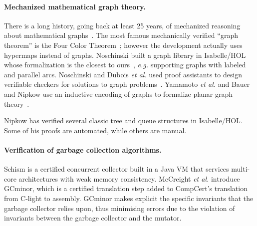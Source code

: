 \vspace{-1ex}
\paragraph{Mechanized mathematical graph theory.} There is a long history,
going back at least 25 years, of mechanized reasoning about mathematical
graphs~\cite{wong1991}.  The most famous mechanically verified ``graph theorem''
is the Four Color Theorem~\cite{gonthier2005computer}; however
the development actually uses hypermaps instead of graphs.
Noschinski built a graph library in Isabelle/HOL whose formalization
is the closest to ours~\cite{noschinski2015}, \emph{e.g.} supporting
graphs with labeled and parallel arcs.
Noschinski and Dubois \emph{et al.} used proof assistants to design verifiable
checkers for solutions to graph problems~\cite{noschinski2015formalizing,dubois2015graphes}.
Yamamoto \emph{et al.} and Bauer and Nipkow use an inductive
encoding of graphs to formalize planar graph theory~\cite{yamamoto1995formalization,bauer20025}.

Nipkow \cite{nipkow2016, nipkow2017} has verified several classic
tree and queue structures in Isabelle/HOL. Some of his proofs are automated, while
others are manual. 

\paragraph{Verification of garbage collection algorithms.}
Schism \cite{gcexample4,gcexample4a} is a certified concurrent
collector built in a Java VM that services multi-core architectures with weak memory consistency.
McCreight \emph{et al.} \cite{gcexample5, gcexample3} introduce GCminor, which is
a certified translation step added to CompCert's translation from C-light to assembly.
GCminor makes explicit the specific invariants that the garbage collector
relies upon, thus minimising errors due to the violation of invariants
between the garbage collector and the mutator.


